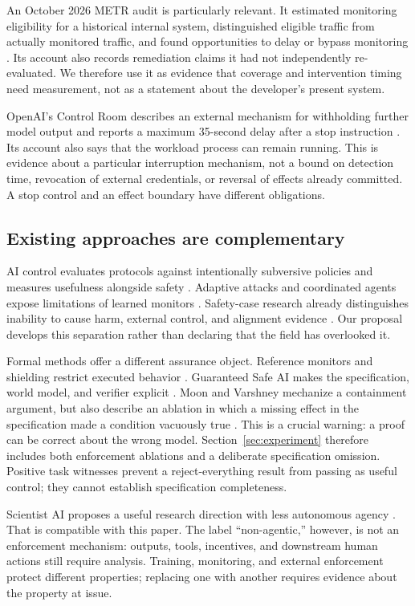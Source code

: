 An October 2026 METR audit is particularly relevant. It estimated monitoring eligibility for a historical internal system, distinguished eligible traffic from actually monitored traffic, and found opportunities to delay or bypass monitoring \cite{metraudit}. Its account also records remediation claims it had not independently re-evaluated. We therefore use it as evidence that coverage and intervention timing need measurement, not as a statement about the developer's present system.

OpenAI's Control Room describes an external mechanism for withholding further model output and reports a maximum 35-second delay after a stop instruction \cite{controlroom}. Its account also says that the workload process can remain running. This is evidence about a particular interruption mechanism, not a bound on detection time, revocation of external credentials, or reversal of effects already committed. A stop control and an effect boundary have different obligations.

\subsection{Existing approaches are complementary}
AI control evaluates protocols against intentionally subversive policies and measures usefulness alongside safety \cite{control}. Adaptive attacks and coordinated agents expose limitations of learned monitors \cite{terekhov,makins}. Safety-case research already distinguishes inability to cause harm, external control, and alignment evidence \cite{safetycase}. Our proposal develops this separation rather than declaring that the field has overlooked it.

Formal methods offer a different assurance object. Reference monitors and shielding restrict executed behavior \cite{saltzer,schneider,shield}. Guaranteed Safe AI makes the specification, world model, and verifier explicit \cite{gsai}. Moon and Varshney mechanize a containment argument, but also describe an ablation in which a missing effect in the specification made a condition vacuously true \cite{moon}. This is a crucial warning: a proof can be correct about the wrong model. Section~\ref{sec:experiment} therefore includes both enforcement ablations and a deliberate specification omission. Positive task witnesses prevent a reject-everything result from passing as useful control; they cannot establish specification completeness.

Scientist AI proposes a useful research direction with less autonomous agency \cite{scientist}. That is compatible with this paper. The label ``non-agentic,'' however, is not an enforcement mechanism: outputs, tools, incentives, and downstream human actions still require analysis. Training, monitoring, and external enforcement protect different properties; replacing one with another requires evidence about the property at issue.

